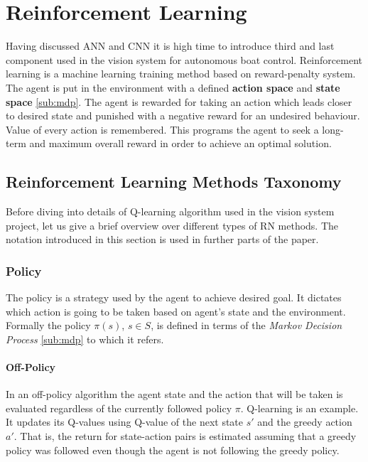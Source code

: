 \chapter{Reinforcement Learning}
\label{cha:reinforcement-learning}

Having discussed ANN and CNN it is high time to introduce third and last component used in the vision system for autonomous boat control. Reinforcement learning is a machine learning training method based on reward-penalty system. The agent is put in the environment with a defined \textbf{action space} and \textbf{state space} \ref{sub:mdp}. The agent is rewarded for taking an action which leads closer to desired state and punished with a negative reward for an undesired behaviour. Value of every action is remembered. This programs the agent to seek a long-term and maximum overall reward in order to achieve an optimal solution.

\section{Reinforcement Learning Methods Taxonomy}
\label{sec:classification-of-reinforcement-learning-methods}

Before diving into details of Q-learning algorithm used in the vision system project, let us give a brief overview over different types of RN methods. The notation introduced in this section is used in further parts of the paper.

\subsection{Policy}
\label{sub:policy}

The policy is a strategy used by the agent to achieve desired goal. It dictates which action is going to be taken based on agent's state and the environment. Formally the policy $\pi(s)$, $s\in{S}$, is defined in terms of the \emph{Markov Decision Process} \ref{sub:mdp} to which it refers. 

\subsubsection*{Off-Policy}
\label{sub2:off-poicy}

In an off-policy algorithm the agent state and the action that will be taken is evaluated regardless of the currently followed policy $\pi$. Q-learning is an example. It updates its Q-values using Q-value of the next state $s'$ and the greedy action $a'$. That is, the return for state-action pairs is estimated assuming that a greedy policy was followed even though the agent is not following the greedy policy.

